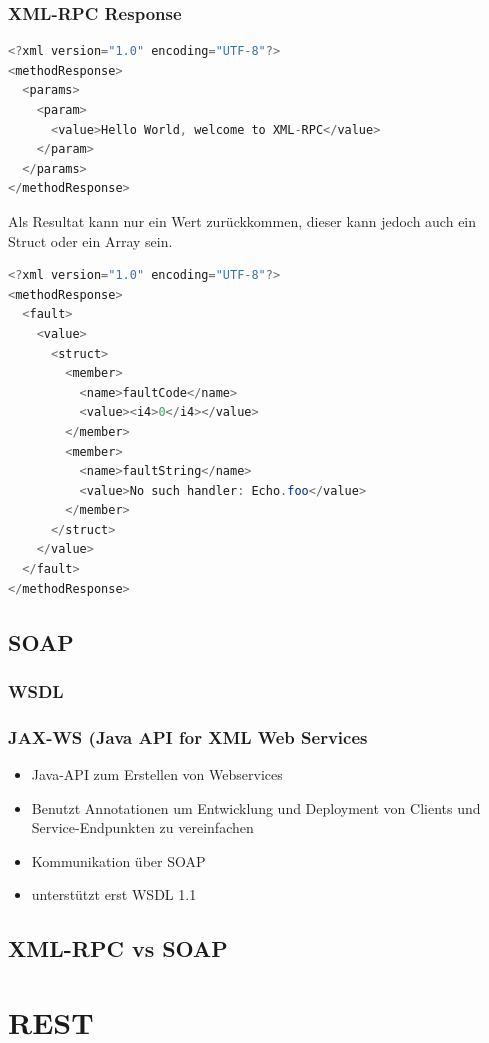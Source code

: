 \documentclass[10pt]{article}
\begin{document}
\subsubsection{XML-RPC Response}
\begin{lstlisting}[language=Java, caption=Single Result, style=JavaStyle]
<?xml version="1.0" encoding="UTF-8"?>
<methodResponse>
  <params>
    <param>
      <value>Hello World, welcome to XML-RPC</value>
    </param>
  </params>
</methodResponse>
\end{lstlisting}
Als Resultat kann nur ein Wert zurückkommen, dieser kann jedoch auch ein Struct oder ein Array sein.

\begin{lstlisting}[language=Java, caption=Fault Result, style=JavaStyle]
<?xml version="1.0" encoding="UTF-8"?>
<methodResponse>
  <fault>
    <value>
      <struct>
        <member>
          <name>faultCode</name>
          <value><i4>0</i4></value>
        </member>
        <member>
          <name>faultString</name>
          <value>No such handler: Echo.foo</value>
        </member>
      </struct>
    </value>
  </fault>
</methodResponse>
\end{lstlisting}


\subsection{SOAP}
\subsubsection{WSDL}
\subsubsection{JAX-WS (Java API for XML Web Services}
\begin{itemize}
\item Java-API zum Erstellen von Webservices
\item Benutzt Annotationen um Entwicklung und Deployment von Clients und Service-Endpunkten zu vereinfachen
\item Kommunikation über SOAP
\item unterstützt erst WSDL 1.1
\end{itemize}

\subsection{XML-RPC vs SOAP}

\section{REST}

\end{document}

